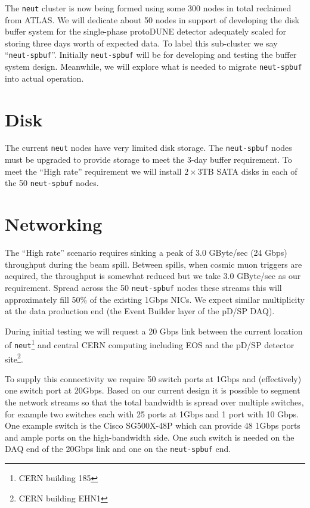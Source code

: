 \documentclass[pdftex,12pt,letter]{article}
\begin{document}
The \texttt{neut} cluster is now being formed using some 300 nodes in
total reclaimed from ATLAS.  We will dedicate about 50 nodes in
support of developing the disk buffer system for the single-phase
protoDUNE detector adequately scaled for storing three days worth of
expected data.  To label this sub-cluster we say
``\texttt{neut-spbuf}''.  Initially \texttt{neut-spbuf} will be for
developing and testing the buffer system design.  Meanwhile, we will
explore what is needed to migrate \texttt{neut-spbuf} into actual
operation.

\section{Disk}

The current \texttt{neut} nodes have very limited disk storage.  The
\texttt{neut-spbuf} nodes must be upgraded to provide storage to meet
the 3-day buffer requirement. To meet the ``High rate'' requirement we
will install $2\times 3$TB SATA disks in each of the 50
\texttt{neut-spbuf} nodes.

\section{Networking}

The ``High rate'' scenario requires sinking a peak of 3.0 GByte/sec
(24 Gbps) throughput during the beam spill.  Between spills, when
cosmic muon triggers are acquired, the throughput is somewhat reduced
but we take 3.0 GByte/sec as our requirement.  Spread across the 50
\texttt{neut-spbuf} nodes these streams this will approximately fill
50\% of the existing 1Gbps NICs.  We expect similar multiplicity at
the data production end (the Event Builder layer of the pD/SP DAQ).

During initial testing we will request a 20 Gbps link between the
current location of \texttt{neut}\footnote{CERN building 185} and
central CERN computing including EOS and the pD/SP detector
site\footnote{CERN building EHN1}.

To supply this connectivity we require 50 switch ports at 1Gbps and
(effectively) one switch port at 20Gbps.  Based on our current design
it is possible to segment the network streams so that the total
bandwidth is spread over multiple switches, for example two switches
each with 25 ports at 1Gbps and 1 port with 10 Gbps.  One example
switch is the Cisco SG500X-48P which can provide 48 1Gbps ports and
ample ports on the high-bandwidth side.  One such switch is needed on
the DAQ end of the 20Gbps link and one on the \texttt{neut-spbuf} end.
\end{document}
